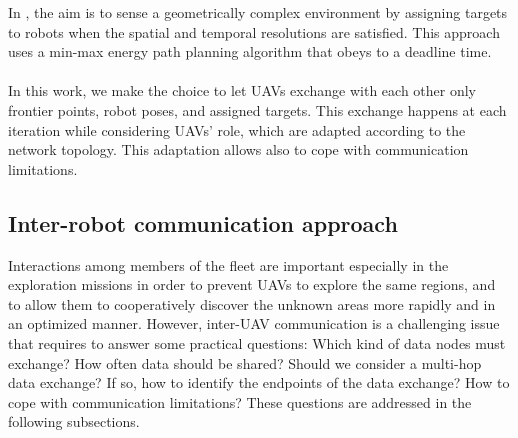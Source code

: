 \documentclass[11pt,openany]{book}
\begin{document}
\begin{algorimth}[H]
In \cite{dai2018quality}, the aim is to sense a geometrically complex environment by assigning targets to robots when the spatial and temporal resolutions are satisﬁed. This approach uses a min-max energy path planning algorithm that obeys to a deadline time.\\\\
In this work, we make the choice to let UAVs exchange with each other only frontier points, robot poses, and assigned targets. This exchange happens at each iteration while considering UAVs’ role, which are adapted according to the network topology. This adaptation allows also to cope with communication limitations.
\subsection{Inter-robot communication approach}
Interactions among members of the ﬂeet are important especially in the exploration missions in order to prevent UAVs to explore the same regions, and to allow them to cooperatively discover the unknown areas more rapidly and in an optimized manner. However, inter-UAV communication is a challenging issue that requires to answer some practical questions: Which kind of data nodes must exchange? How often data should be shared? Should we consider a multi-hop data exchange? If so, how to identify the endpoints of the data exchange? How to cope with communication limitations? These questions are addressed in the following subsections.

\end{algorimth}
\end{document}
